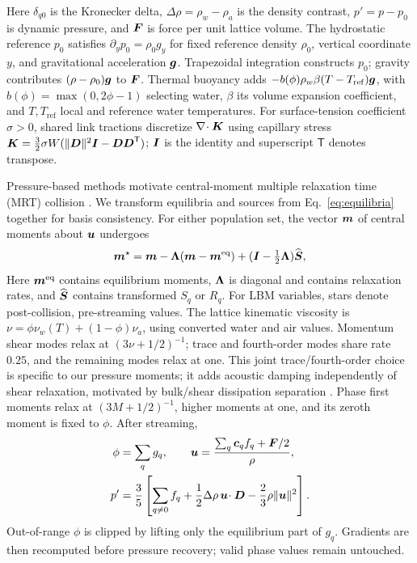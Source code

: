 Here $\delta_{q0}$ is the Kronecker delta, $\Delta\rho=\rho_w-\rho_a$ is
the density contrast, $p'=p-p_0$ is dynamic pressure, and $\boldsymbol{F}$ is force
per unit lattice volume. The hydrostatic reference $p_0$ satisfies
$\partial_y p_0=\rho_0 g_y$ for fixed reference density $\rho_0$,
vertical coordinate $y$, and gravitational acceleration $\boldsymbol{g}$.
Trapezoidal integration constructs $p_0$; gravity contributes
$(\rho-\rho_0)\boldsymbol{g}$ to $\boldsymbol{F}$.
Thermal buoyancy adds
$-b(\phi)\rho_w\beta(T-T_{\mathrm{ref}})\boldsymbol{g}$, with
$b(\phi)=\max(0,2\phi-1)$ selecting water, $\beta$ its volume expansion
coefficient, and $T,T_{\mathrm{ref}}$ local and reference water temperatures.
For surface-tension coefficient $\sigma>0$, shared link tractions discretize
$\nabla\!\cdot\boldsymbol{K}$ using capillary stress
$\boldsymbol{K}=\tfrac32\sigma W
      (\lVert\boldsymbol{D}\rVert^2\boldsymbol{I}-\boldsymbol{D}\boldsymbol{D}^{\mathsf T})$;
$\boldsymbol{I}$ is the identity and superscript $\mathsf T$ denotes transpose.

Pressure-based methods motivate central-moment multiple relaxation time
(MRT) collision \citep{Hajabdollahi2021}. We transform equilibria and sources
from Eq.~\eqref{eq:equilibria} together for basis consistency.
For either population set, the vector $\boldsymbol{m}$ of
central moments about $\boldsymbol{u}$ undergoes
\begin{equation}
      \boldsymbol{m}^\star=\boldsymbol{m}-\boldsymbol{\Lambda}(\boldsymbol{m}-\boldsymbol{m}^{\mathrm{eq}})
      +(\boldsymbol{I}-\tfrac12\boldsymbol{\Lambda})\widehat{\boldsymbol{S}},
      \label{eq:collision}
\end{equation}
Here $\boldsymbol{m}^{\mathrm{eq}}$ contains equilibrium moments,
$\boldsymbol{\Lambda}$ is diagonal and contains relaxation rates, and
$\widehat{\boldsymbol{S}}$ contains transformed $S_q$ or $R_q$.
For LBM variables, stars denote post-collision, pre-streaming values.
The lattice kinematic viscosity is
$\nu=\phi\nu_w(T)+(1-\phi)\nu_a$, using converted water and air values.
Momentum shear modes relax at $(3\nu+1/2)^{-1}$; trace and fourth-order
modes share rate $0.25$, and the remaining modes relax at one.
This joint trace/fourth-order choice is specific to our pressure moments;
it adds acoustic damping independently of shear relaxation, motivated by
bulk/shear dissipation separation \citep{Qi2025}.
Phase first moments relax at $(3M+1/2)^{-1}$, higher moments at one,
and its zeroth moment is fixed to $\phi$.
After streaming,
\begin{equation}
      \begin{aligned}
            \phi & =\sum_q g_q,\qquad
            \boldsymbol{u}=\frac{\sum_q\boldsymbol{c}_q f_q+\boldsymbol{F}/2}{\rho},           \\
            p'   & =\frac35\left[\sum_{q\ne0}f_q
                                 +\frac12\Delta\rho\,\boldsymbol{u}\!\cdot\boldsymbol{D}
                                 -\frac23\rho\lVert\boldsymbol{u}\rVert^2\right].
      \end{aligned}
      \label{eq:recovery}
\end{equation}
Out-of-range $\phi$ is clipped by lifting only the equilibrium part of
$g_q$.
Gradients are then recomputed before pressure recovery; valid phase values remain untouched.

